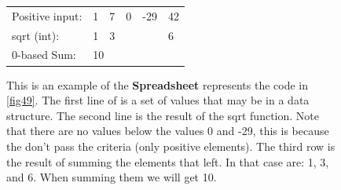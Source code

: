 \begin{figure}[H]
\begin{table}[H]
\centering
\begin{tabular}{llllll}
Positive input: & 1  & 7  & 0 & -29 & 42 \\
sqrt (int):     & 1  & 3  &   &     & 6  \\ \hline
0-based Sum:    & \multicolumn{5}{l}{10} \\
\end{tabular}
\end{table}
\caption{This is an example of the \textbf{Spreadsheet} represents the code in \autoref{fig49}. The first line of is a set of values that may be in a data structure. The second line is the result of the sqrt function. Note that there are no values below the values 0 and -29, this is because the don't pass the criteria (only positive elements). The third row is the result of summing the elements that left. In that case are: 1, 3, and 6. When summing them we will get 10.}
\label{fig54}
\end{figure}